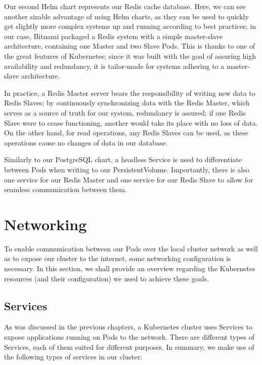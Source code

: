 \documentclass[thesis=B,english]{FITthesis}[2019/12/23]
\begin{document}
Our second Helm chart represents our Redis cache database. Here, we can see another sizable advantage of using Helm charts, as they can be used to quickly get slightly more complex systems up and running according to best practices; in our case, Bitnami packaged a Redis system with a simple master-slave architecture, containing one Master and two Slave Pods. This is thanks to one of the great features of Kubernetes; since it was built with the goal of assuring high availability and redundancy, it is tailor-made for systems adhering to a master-slave architecture.

In practice, a Redis Master server bears the responsibility of writing new data to Redis Slaves; by continuously synchronizing data with the Redis Master, which serves as a source of truth for our system, redundancy is assured; if one Redis Slave were to cease functioning, another would take its place with no loss of data. On the other hand, for read operations, any Redis Slaves can be used, as these operations cause no changes of data in our database. \cite{redis}

Similarly to our PostgreSQL chart, a headless Service is used to differentiate between Pods when writing to our PersistentVolume. Importantly, there is also one service for our Redis Master and one service for our Redis Slave to allow for seamless communication between them.

\newpage

\section{Networking}

To enable communication between our Pods over the local cluster network as well as to expose our cluster to the internet, some networking configuration is necessary. In this section, we shall provide an overview regarding the Kubernetes resources (and their configuration) we used to achieve these goals.

\subsection{Services}

As was discussed in the previous chapters, a Kubernetes cluster uses Services to expose applications running on Pods to the network. There are different types of Services, each of them suited for different purposes. In summary, we make use of the following types of services in our cluster:
\end{document}
